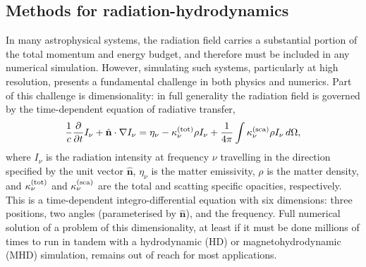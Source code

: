 \documentclass[fleqn,usenatbib]{mnras}
\newcommand{\hatn}{\hat{\mathbf{n}}}
\begin{document}

\subsection{Methods for radiation-hydrodynamics}

In many astrophysical systems, the radiation field carries a substantial portion of the total momentum and energy budget, and therefore must be included in any numerical simulation. However, simulating such systems, particularly at high resolution, presents a fundamental challenge in both physics and numerics. Part of this challenge is dimensionality: in full generality the radiation field is governed by the time-dependent equation of radiative transfer,
\begin{equation}
\frac{1}{c} \frac{\partial}{\partial t} I_\nu + \hatn\cdot\nabla I_\nu = \eta_\nu - \kappa^{\rm (tot)}_\nu \rho I_\nu + \frac{1}{4\pi} \int \kappa^{\rm (sca)}_\nu \rho I_\nu \, d\Omega,
\label{eq:transfer}
\end{equation}
where $I_\nu$ is the radiation intensity at frequency $\nu$ travelling in the direction specified by the unit vector $\hatn$, $\eta_\nu$ is the matter emissivity, $\rho$ is the matter density, and $\kappa_\nu^{\rm (tot)}$ and $\kappa_\nu^{\rm (sca)}$ are the total and scatting specific opacities, respectively. This is a time-dependent integro-differential equation with six dimensions: three positions, two angles (parameterised by $\hatn$), and the frequency. Full numerical solution of a problem of this dimensionality, at least if it must be done millions of times to run in tandem with a hydrodynamic (HD) or magnetohydrodynamic (MHD) simulation, remains out of reach for most applications. 
\end{document}
